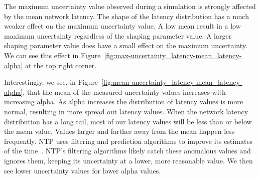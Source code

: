

The maximum uncertainty value observed during a simulation is strongly
affected by the mean network latency. The shape of the latency
distribution has a much weaker effect on the maximum uncertainty
value. A low mean result in a low maximum uncertainty regardless of
the shaping parameter value. A larger shaping parameter value does
have a small effect on the maximum uncertainty. We can see this effect
in Figure~\ref{fig:max-uncertainty_latency-mean_latency-alpha} at the
top right corner.

Interestingly, we see, in Figure~\ref{fig:mean-uncertainty_latency-mean_latency-alpha}, that the mean of the measured uncertainty values
increases with increasing alpha. As alpha increases the distribution of 
latency values is more normal, resulting in more spread out latency values.
When the network
latency distribution has a long tail, most of our latency values will be less
than or below the mean value. Values larger and farther away from the
mean happen less frequently. NTP uses
filtering and prediction algorithms to improve its estimates of the
time~\citep{Burbank2010}. NTP's filtering algorithms likely catch
these anomalous values and ignores them, keeping its uncertainty at a
lower, more reasonable value. We then see lower uncertainty values for
lower alpha values.

